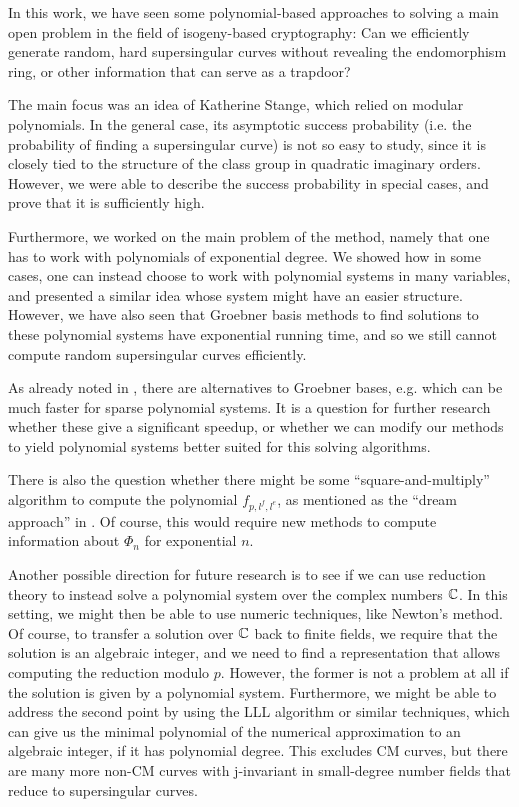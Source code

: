 
In this work, we have seen some polynomial-based approaches to solving a main open problem in the field of isogeny-based cryptography:
Can we efficiently generate random, hard supersingular curves without revealing the endomorphism ring, or other information that can serve as a trapdoor?

The main focus was an idea of Katherine Stange, which relied on modular polynomials.
In the general case, its asymptotic success probability (i.e. the probability of finding a supersingular curve) is not so easy to study, since it is closely tied to the structure of the class group in quadratic imaginary orders.
However, we were able to describe the success probability in special cases, and prove that it is sufficiently high.

Furthermore, we worked on the main problem of the method, namely that one has to work with polynomials of exponential degree.
We showed how in some cases, one can instead choose to work with polynomial systems in many variables, and presented a similar idea whose system might have an easier structure.
However, we have also seen that Groebner basis methods to find solutions to these polynomial systems have exponential running time, and so we still cannot compute random supersingular curves efficiently.

As already noted in \cite{base_paper}, there are alternatives to Groebner bases, e.g. \cite{poly_system_solve_algorithm} which can be much faster for sparse polynomial systems.
It is a question for further research whether these give a significant speedup, or whether we can modify our methods to yield polynomial systems better suited for this solving algorithms.

There is also the question whether there might be some ``square-and-multiply'' algorithm to compute the polynomial $f_{p, l^f, l^e}$, as mentioned as the ``dream approach'' in \cite{base_paper}.
Of course, this would require new methods to compute information about $\Phi_n$ for exponential $n$.

Another possible direction for future research is to see if we can use reduction theory to instead solve a polynomial system over the complex numbers $\mathbb{C}$.
In this setting, we might then be able to use numeric techniques, like Newton's method.
Of course, to transfer a solution over $\mathbb{C}$ back to finite fields, we require that the solution is an algebraic integer, and we need to find a representation that allows computing the reduction modulo $p$.
However, the former is not a problem at all if the solution is given by a polynomial system.
Furthermore, we might be able to address the second point by using the LLL algorithm or similar techniques, which can give us the minimal polynomial of the numerical approximation to an algebraic integer, if it has polynomial degree.
This excludes CM curves, but there are many more non-CM curves with j-invariant in small-degree number fields that reduce to supersingular curves.

